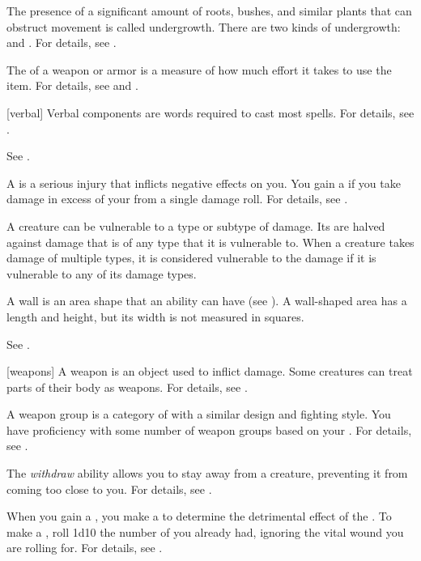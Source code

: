  The presence of a significant amount of roots, bushes, and similar plants that can obstruct movement is called undergrowth.
There are two kinds of undergrowth:  and .
For details, see .

 The  of a weapon or armor is a measure of how much effort it takes to use the item.
For details, see  and .

[verbal] Verbal components are words required to cast most spells.
For details, see .

 See .

 A  is a serious injury that inflicts negative effects on you.
You gain a  if you take damage in excess of your  from a single damage roll.
For details, see .

 A creature can be vulnerable to a type or subtype of damage.
Its  are halved against damage that is of any type that it is vulnerable to.
When a creature takes damage of multiple types, it is considered vulnerable to the damage if it is vulnerable to any of its damage types.

 A wall is an area shape that an ability can have (see ).
A wall-shaped area has a length and height, but its width is not measured in squares.

 See .

[weapons] A weapon is an object used to inflict damage.
Some creatures can treat parts of their body as weapons.
For details, see .

 A weapon group is a category of  with a similar design and fighting style.
You have proficiency with some number of weapon groups based on your .
For details, see .

 The \textit{withdraw} ability allows you to stay away from a creature, preventing it from coming too close to you.
For details, see .

 When you gain a , you make a  to determine the detrimental effect of the .
To make a , roll 1d10 \sub the number of  you already had, ignoring the vital wound you are rolling for.
For details, see .

